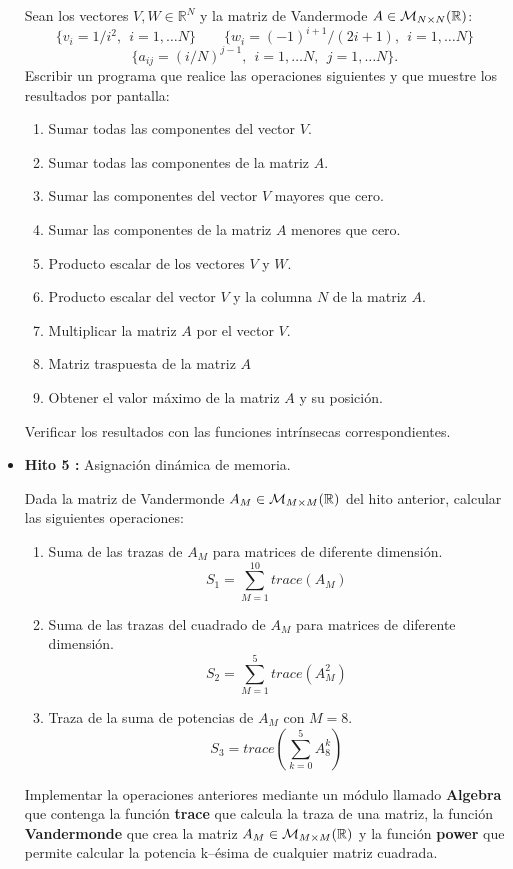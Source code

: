 \documentclass[12pt,spanish]{article}
\begin{document}
\begin{itemize}
Sean los vectores $V, W \in \mathbb{R}^N$ y la matriz de Vandermode $A \in 
{\cal M}_{N \times N} (\mathbb{R})$: 
$$
\{ v_i =  1/i^2, \ \  i=1, \ldots N \} \qquad  \{  w_i = (-1)^{i+1}/(2i+1), \ \   i=1, \ldots N  \} 
$$
$$
\{ a_{ij} = (i/N)^{j-1}, \ \ i=1, \ldots N, \ \  j=1, \ldots N \}. 
$$
Escribir un programa que realice las operaciones siguientes y que muestre los
resultados por pantalla: 
\begin{enumerate}
	\item Sumar todas las componentes del vector $V$. 
	\item Sumar todas las componentes de la matriz $A$.   
	\item Sumar las componentes del vector $V$ mayores que cero.
	\item Sumar las componentes de la matriz $A$ menores que cero.   
	\item Producto escalar de los vectores $V$ y $W$.   
	\item Producto escalar del vector $V$ y la columna $N$ de la matriz $A$. 
	\item Multiplicar la matriz $A$ por el vector $V$.
	\item Matriz traspuesta de la matriz $A$   
	\item Obtener el valor máximo de la matriz $A$ y su posición.
\end{enumerate}

Verificar los resultados con las funciones intrínsecas correspondientes. 


\item {\bf Hito 5 :}   Asignación dinámica de memoria.

Dada la matriz  de Vandermonde $A_M \in {\cal M}_{M \times M} (\mathbb{R})$ del hito anterior,
calcular las siguientes operaciones: 


\begin{enumerate}	
	\item Suma de las trazas de $ A_M $ para matrices de diferente dimensión. 
	$$  S_1 = \sum_{M=1} ^{10} trace(A_M) $$ 
	\item  Suma de las trazas del cuadrado de $ A_M $ para matrices de diferente dimensión. 
	$$  S_2 = \sum_{M=1} ^{5} trace(A_M^2) $$ 
	\item Traza de la suma de potencias de $ A_M $  con $ M=8 $.
	$$  S_3 = trace \left( \sum_{k=0} ^{5} A_8^k  \right) $$
\end{enumerate}  
 
Implementar la operaciones anteriores mediante un módulo llamado \textbf{Algebra} 
que contenga la función  \textbf{trace} que calcula la traza de una matriz, la 
función  \textbf{Vandermonde} que crea la matriz  $ A_M \in { \cal M } _{ M 
\times M } ( \mathbb{R} )$ 
 y la función \textbf{power} que permite calcular la potencia k--ésima de 
 cualquier matriz cuadrada. 


\end{itemize}
\end{document}
